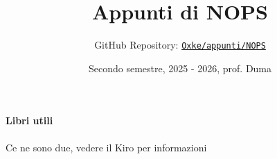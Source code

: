 

\title{Appunti di NOPS}
\author{GitHub Repository:
\href{https://github.com/Oxke/appunti/tree/main/AlgebraSuperiore}{\texttt{Oxke/appunti/NOPS}}}

\date{Secondo semestre, 2025 \-- 2026, prof. Duma}


\maketitle
\paragraph{Libri utili}
Ce ne sono due, vedere il Kiro per informazioni

\tableofcontents




